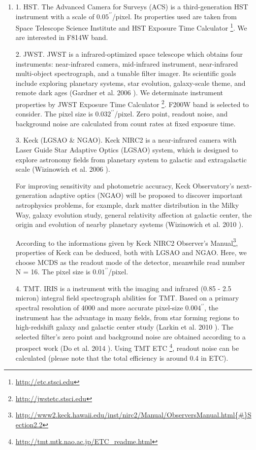 \documentclass[a4paper,11pt]{article}
\begin{document}
\begin{enumerate}

\item    1. HST. The Advanced Camera for Surveys (ACS) is a
    third-generation HST instrument with a scale of
    $0.05^{\prime\prime}$/pixel. Its properties used are taken from
    Space Telescope Science Institute and HST Exposure Time Calculator
    \footnote{\url{http://etc.stsci.edu}}. We are interested in F814W
    band.
    
    2. JWST. JWST is a infrared-optimized space telescope which obtains four instruments: near-infrared camera, mid-infrared instrument, near-infrared multi-object spectrograph, and a tunable filter imager. Its scientific goals include exploring planetary systems, star evolution, galaxy-scale theme, and remote dark ages (Gardner et al. 2006 \cite{2006SSRv..123..485G}). We determinate instrument properties by JWST Exposure Time Calculator \footnote{\url{http://jwstetc.stsci.edu}}. F200W band is selected to consider. The pixel size is $0.032^{\prime\prime}$/pixel. Zero point, readout noise, and background noise are calculated from count rates at fixed exposure time.
    
	    3. Keck (LGSAO \& NGAO). Keck NIRC2 is a near-infrared camera with Laser Guide Star Adaptive Optics (LGSAO) system, which is designed to explore astronomy fields from planetary system to galactic and extragalactic scale (Wizinowich et al. 2006 \cite{2006PASP..118..297W}).

	     For improving sensitivity and photometric accuracy, Keck Observatory's next-generation adaptive optics (NGAO) will be proposed to discover important astrophysics problems, for example, dark matter distribution in the Milky Way, galaxy evolution study, general relativity affection at galactic center, the origin and evolution of nearby planetary systems (Wizinowich et al. 2010 \cite{2010SPIE.7736E..0KW}).

	    According to the informations given by Keck NIRC2 Observer's Manual\footnote{\url{http://www2.keck.hawaii.edu/inst/nirc2/Manual/ObserversManual.html{\#}Section2.2}}, properties of Keck can be deduced, both with LGSAO and NGAO. Here, we choose MCDS as the readout mode of the detector, meanwhile read number N = 16. The pixel size is $0.01^{\prime\prime}$/pixel.
    
    4. TMT. IRIS is a instrument with the imaging and infrared (0.85 - 2.5 micron) integral field spectrograph abilities for TMT. Based on a primary spectral resolution of 4000 and more accurate pixel-size $0.004^{\prime\prime}$, the instrument has the advantage in many fields, from star forming regions to high-redshift galaxy and galactic center study (Larkin et al. 2010 \cite{2010SPIE.7735E..29L}). The selected filter's zero point and background noise are obtained according to a prospect work (Do et al. 2014 \cite{2014AJ....147...93D}). Using TMT ETC \footnote{\url{http://tmt.mtk.nao.ac.jp/ETC_readme.html}}, readout noise can be calculated (please note that the total efficiency is around 0.4 in ETC). 
    

\end{enumerate}
\end{document}
